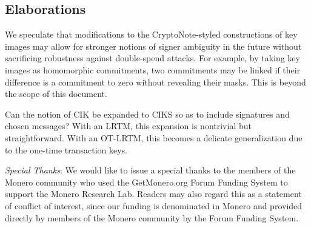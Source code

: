 \documentclass{mrl}
\theoremstyle{definition}
\begin{document}
\subsection{Elaborations}


 




We speculate that modifications to the CryptoNote-styled constructions of key images may allow for stronger notions of signer ambiguity in the future without sacrificing robustness against double-spend attacks. For example, by taking key images as homomorphic commitments, two commitments may be linked if their difference is a commitment to zero without revealing their masks. This is beyond the scope of this document.

Can the notion of CIK be expanded to CIKS so as to include signatures and chosen messages? With an LRTM, this expansion is nontrivial but straightforward. With an OT-LRTM, this becomes a delicate generalization due to the one-time transaction keys.



\emph{Special Thanks}: We would like to issue a special thanks to the members of the Monero community who used the GetMonero.org Forum Funding System to support the Monero Research Lab. Readers may also regard this as a statement of conflict of interest, since our funding is denominated in Monero and provided directly by members of the Monero community by the Forum Funding System.

\medskip{}



\end{document}
